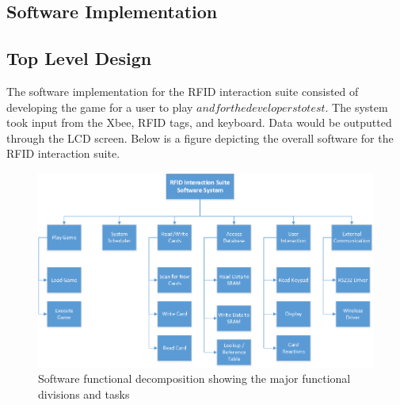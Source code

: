 \documentclass[12pt]{article} %
\begin{document}
\begin{itemize}
\section{Software Implementation}\label{swImplementation}
%
%

\subsection{Top Level Design}\label{swTopLevel} %
%

The software implementation for the RFID interaction suite consisted of developing the game for a user to play \(and for the developers to test\). The system took input from the Xbee, RFID tags, and keyboard. Data would be outputted through the LCD screen. Below is a figure depicting the overall software for the RFID interaction suite. 

\begin{figure}[H]
	\centering
	\includegraphics[width=\textwidth]{images/funDecomp.png}
	\caption{Software functional decomposition showing the major functional divisions and tasks}
	\label{fig:funDecomp}
\end{figure}


\end{itemize}
\end{document}
